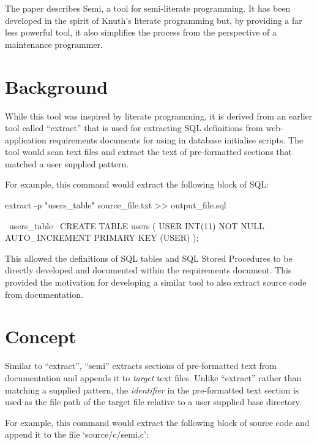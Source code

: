 \documentclass[]{article}
\begin{document}
The paper describes Semi, a tool for semi-literate programming.
It has been developed in the spirit of Knuth's literate programming but, by providing a far less powerful tool, it also simplifies the process from the perspective of a maintenance programmer.

\section{	Background}

While this tool was inspired by literate programming, it is derived from an earlier tool called ``extract'' that is used for extracting SQL definitions from web-application requirements documents for using in database initialise scripts.
The tool would scan text files and extract the text of pre-formatted sections that matched a user supplied pattern.


For example, this command would extract the following block of SQL:

\begin{verbatimtab}
extract -p "users_table" source_file.txt >> output_file.sql

\end{verbatimtab}
\begin{verbatimtab}
	~users_table~
	CREATE TABLE users
	(
	USER        INT(11)  NOT NULL AUTO_INCREMENT
	PRIMARY KEY (USER)
	);
	~

\end{verbatimtab}

This allowed the definitions of SQL tables and SQL Stored Procedures to be directly developed and documented within the requirements document.
This provided the motivation for developing a similar tool to also extract source code from documentation.

\section{	Concept}

Similar to ``extract'', ``semi'' extracts sections of pre-formatted text from documentation and appends it to \emph{target} text files.
Unlike ``extract'' rather than matching a supplied pattern, the \emph{identifier} in the pre-formatted text section is used as the file path of the target file relative to a user supplied base directory.


For example, this command would extract the following block of source code and append it to the file `source/c/semi.c':
\end{document}
